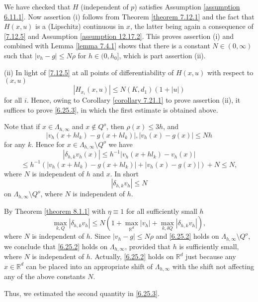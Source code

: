 \documentclass[11pt, reqno]{amsart}
\theoremstyle{definition}
\theoremstyle{remark}
\begin{document}
We have checked that $H$ (independent of $p$) satisfies
Assumption \ref{assumption 6.11.1}. Now assertion (i)
follows from Theorem \ref{theorem 7.12.1} and the fact that
$H(x,u)$ is a (Lipschitz) continuous in $x$, the latter being
again a consequence of \eqref{7.12.5} and
Assumption \ref{assumption 12.17.2}. 
This proves assertion (i) and combined with 
  Lemma \ref{lemma 7.4.1} shows that there is a
constant  $N  \in(0,\infty)$ such that
  $|v_{h}-g|\leq N \rho$
for   $h\in(0,h_{0}]$, which is part assertion (ii).

(ii) In light of \eqref{7.12.5}
at all points of  differentiability of $H(x,u)$
with respect to $(x,u)$
$$
|H_{x_{i}}(x,u)|\leq N(K,d_{1})(1+|u|)
$$
for all $i$. Hence,
owing to   Corollary \ref{corollary 7.21.1} to prove
assertion (ii),
it suffices to prove \eqref{6.25.3}, in which the first
estimate is obtained above.

Note that if $x\in\Lambda_{h,\infty}$ and 
 $x\not\in Q^{o}$, then $\rho(x)\leq 3h$, and
$$
|v_{h}(x+hl_{k})-g(x+hl_{k})|,  |v_{h}(x)-g(x)|\leq Nh
$$
 for any $k$. Hence for $x\in\Lambda_{h,\infty}
\setminus Q^{o}$
we have
$$
|\delta_{h,k}v_{h}(x)|\leq h^{-1}|v_{h}(x+hl_{k})-v_{h}(x)|
$$
$$
\leq h^{-1}( |v_{h}(x+hl_{k})-g(x+hl_{k})|
+|v_{h}(x)-g(x)|)+N\leq N,
$$
where $N$ is independent of $h$ and $x$. In short
\begin{equation}
                                       \label{6.25.2}
|\delta_{h,k}v_{h} |\leq N
\end{equation}
on $\Lambda_{h,\infty}\setminus Q^{o}$,
 where $N$ is independent of $h$.

By Theorem \ref{theorem 8.1.1} with $\eta\equiv1$
for all sufficiently small $h$
$$
\max_{k,Q}|\delta_{h,k}v_{h}|\leq N(1+\max_{{\mathbb{R}}^{d}}|v_{h}|
+\max_{k,\delta Q}|\delta_{h,k}v_{h}|),
$$
where $N$ is independent of $h$. Since $|v_{h}-g|\leq N\rho$
and \eqref{6.25.2} holds on 
$\Lambda_{h,\infty}\setminus Q^{o}$, we conclude that
\eqref{6.25.2} holds on $\Lambda_{h,\infty}$, 
 provided that $h$
is sufficiently small, where $N$ is independent of $h$.
Actually, \eqref{6.25.2} holds on ${\mathbb{R}}^{d}$ just because
any $x\in{\mathbb{R}}^{d}$ can be placed into an appropriate shift
of $\Lambda_{h,\infty}$ with the shift not affecting any
of the above constants $N$.

 
 Thus, we estimated the second quantity
in \eqref{6.25.3}.
\end{document}
